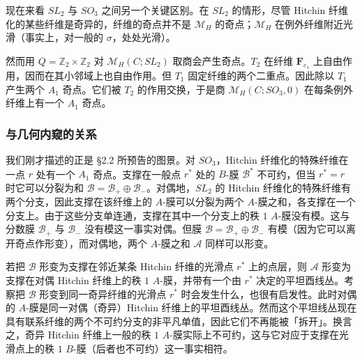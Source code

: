 现在来看 $SL_2$ 与 $SO_3$ 之间另一个关键区别。在 $SL_2$ 的情形，尽管 Hitchin 纤维化的某些纤维是奇异的，纤维的奇点并不是 $\mathcal{M}_H$ 的奇点；$\mathcal{M}_H$ 在例外纤维附近光滑（事实上，对一般的 $\sigma$，处处光滑）。


然而用 $Q=\mathbb{Z}_2\times\mathbb{Z}_2$ 对 $\mathcal{M}_H(C;SL_2)$ 取商会产生奇点。$T_2$ 在纤维 $\boldsymbol{F}_{e_1}$ 上自由作用，因而在其小邻域上也自由作用。但 $T_1$ 固定纤维的两个二重点。因此除以 $T_1$ 产生两个 $A_1$ 奇点。它们被 $T_2$ 的作用交换，于是商 $\mathcal{M}_H(C;SO_3,0)$ 在每条例外纤维上有一个 $A_1$ 奇点。

\subsubsection{与几何内窥的关系}

我们刚才描述的正是 §2.2 所预告的图景。对 $SO_3$，Hitchin 纤维化的特殊纤维在一点 $r$ 处有一个 $A_1$ 奇点。支撑在一般点 $r^*$ 处的 $B$-膜 $\mathcal{B}^*$ 不可约，但当 $r^*=r$ 时它可以分裂为和 $\mathcal{B}=\mathcal{B}_+\oplus\mathcal{B}_-$。对偶地，$SL_2$ 的 Hitchin 纤维化的特殊纤维有两个分支，因此支撑在该纤维上的 $A$-膜可以分裂为两个 $A$-膜之和，各支撑在一个分支上。由于这些分支单连通，支撑在其中一个分支上的秩 $1$ $A$-膜没有模。这与分数膜 $\mathcal{B}_+$ 与 $\mathcal{B}_-$ 没有模这一事实对偶。但膜 $\mathcal{B}=\mathcal{B}_+\oplus\mathcal{B}_-$ 有模（因为它可以离开奇点作形变），而对偶地，两个 $A$-膜之和 $\mathcal{A}$ 同样可以形变。

若把 $\mathcal{B}$ 形变为支撑在邻近某条 Hitchin 纤维的光滑点 $r^*$ 上的点层，则 $\mathcal{A}$ 形变为支撑在对偶 Hitchin 纤维上的秩 $1$ $A$-膜，并带有一个由 $r^*$ 决定的平坦酉线丛。考察把 $\mathcal{B}$ 形变到同一奇异纤维的光滑点 $r^*$ 时会发生什么，也很有启发性。此时对偶的 $A$-膜是同一对偶（奇异）Hitchin 纤维上的平坦酉线丛。然而这个平坦线丛现在具有联系纤维的两个不可约分支的非平凡单值，因此它们不再能被「拆开」。换言之，奇异 Hitchin 纤维上一般的秩 $1$ $A$-膜实际上不可约，这与它对应于支撑在光滑点上的秩 $1$ $B$-膜（后者也不可约）这一事实相符。

